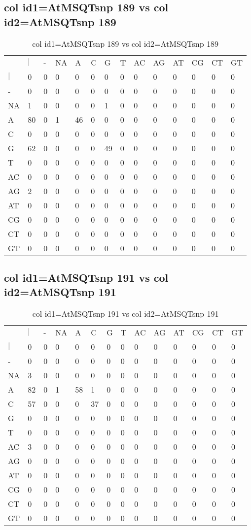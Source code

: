 \subsection{col id1=AtMSQTsnp 189 vs col id2=AtMSQTsnp 189}
\begin{center}
\begin{longtable}{|l|l|l|l|l|l|l|l|l|l|l|l|l|l|}
\caption{col id1=AtMSQTsnp 189 vs col id2=AtMSQTsnp 189} \label{table_dm560}\\
\hline
\\
\hline
&$|$&-&NA&A&C&G&T&AC&AG&AT&CG&CT&GT\\
$|$&0&0&0&0&0&0&0&0&0&0&0&0&0\\
-&0&0&0&0&0&0&0&0&0&0&0&0&0\\
NA&1&0&0&0&0&1&0&0&0&0&0&0&0\\
A&80&0&1&46&0&0&0&0&0&0&0&0&0\\
C&0&0&0&0&0&0&0&0&0&0&0&0&0\\
G&62&0&0&0&0&49&0&0&0&0&0&0&0\\
T&0&0&0&0&0&0&0&0&0&0&0&0&0\\
AC&0&0&0&0&0&0&0&0&0&0&0&0&0\\
AG&2&0&0&0&0&0&0&0&0&0&0&0&0\\
AT&0&0&0&0&0&0&0&0&0&0&0&0&0\\
CG&0&0&0&0&0&0&0&0&0&0&0&0&0\\
CT&0&0&0&0&0&0&0&0&0&0&0&0&0\\
GT&0&0&0&0&0&0&0&0&0&0&0&0&0\\
\hline
\end{longtable}
\end{center}

\subsection{col id1=AtMSQTsnp 191 vs col id2=AtMSQTsnp 191}
\begin{center}
\begin{longtable}{|l|l|l|l|l|l|l|l|l|l|l|l|l|l|}
\caption{col id1=AtMSQTsnp 191 vs col id2=AtMSQTsnp 191} \label{table_dm562}\\
\hline
\\
\hline
&$|$&-&NA&A&C&G&T&AC&AG&AT&CG&CT&GT\\
$|$&0&0&0&0&0&0&0&0&0&0&0&0&0\\
-&0&0&0&0&0&0&0&0&0&0&0&0&0\\
NA&3&0&0&0&0&0&0&0&0&0&0&0&0\\
A&82&0&1&58&1&0&0&0&0&0&0&0&0\\
C&57&0&0&0&37&0&0&0&0&0&0&0&0\\
G&0&0&0&0&0&0&0&0&0&0&0&0&0\\
T&0&0&0&0&0&0&0&0&0&0&0&0&0\\
AC&3&0&0&0&0&0&0&0&0&0&0&0&0\\
AG&0&0&0&0&0&0&0&0&0&0&0&0&0\\
AT&0&0&0&0&0&0&0&0&0&0&0&0&0\\
CG&0&0&0&0&0&0&0&0&0&0&0&0&0\\
CT&0&0&0&0&0&0&0&0&0&0&0&0&0\\
GT&0&0&0&0&0&0&0&0&0&0&0&0&0\\
\hline
\end{longtable}
\end{center}

